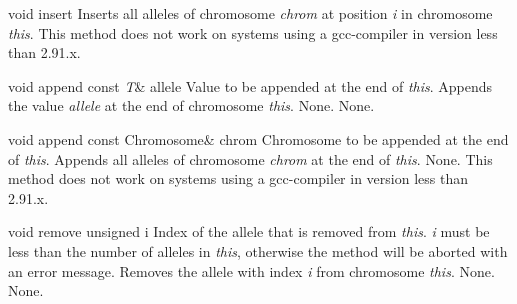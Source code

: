\vspace*{4ex}    

    \setCorrectWidthThree{8pt}

    \printMethodWithParamsSaved
        {void}
        {}
        {insert}
        {Inserts all alleles of chromosome {\em chrom} at position {\em i}
         in chromosome {\em this}.}
        {This method does not work on systems using a gcc-compiler 
         in version less than 2.91.x.}
    \setCorrectWidthThree{4pt}

\clearpage

    \printMethodWithOneParam
    {void} 
    {append}
    {const {\sl T}\&} 
    {allele} 
    {Value to be appended at the end of {\em this}.}
    {Appends the value {\em allele} at the end of chromosome {\em this}.}
    {None.}
    {None.}

\vspace*{4ex}

    \printMethodWithOneParam
    {void} 
    {append}
    {const Chromosome\&}
    {chrom} 
    {Chromosome to be appended at the end of {\em this}.}
    {Appends all alleles of chromosome {\em chrom} at the end of {\em this}.}
    {None.}
    {This method does not work on systems using a gcc-compiler 
         in version less than 2.91.x.}

\vspace*{4ex}

    \printMethodWithOneParam
    {void} 
    {remove}
    {unsigned}
    {i} 
    {Index of the allele that is removed from {\em this}. {\em i}
     must be less than the number of alleles in {\em this}, otherwise
     the method will be aborted with an error message.}
    {Removes the allele with index {\em i} from chromosome {\em this}.}
    {None.}
    {None.}

